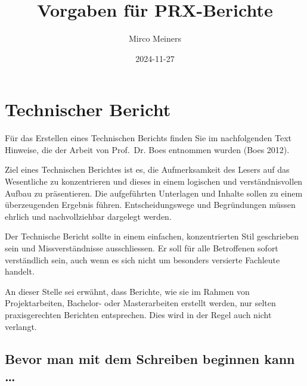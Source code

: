 \documentclass[
  letterpaper,
  DIV=11]{scrartcl}
\title{Vorgaben für PRX-Berichte}
\author{Mirco Meiners}
\date{2024-11-27}
\begin{document}
\maketitle


\section{Technischer Bericht}\label{technischer-bericht}

Für das Erstellen eines Technischen Berichts finden Sie im nachfolgenden
Text Hinweise, die der Arbeit von Prof.~Dr. Boes entnommen wurden (Boes
2012).

Ziel eines Technischen Berichtes ist es, die Aufmerksamkeit des Lesers
auf das Wesentliche zu konzentrieren und dieses in einem logischen und
verständnisvollen Aufbau zu präsentieren. Die aufgeführten Unterlagen
und Inhalte sollen zu einem überzeugenden Ergebnis führen.
Entscheidungswege und Begründungen müssen ehrlich und nachvollziehbar
dargelegt werden.

Der Technische Bericht sollte in einem einfachen, konzentrierten Stil
geschrieben sein und Missverständnisse ausschliessen. Er soll für alle
Betroffenen sofort verständlich sein, auch wenn es sich nicht um
besonders versierte Fachleute handelt.

An dieser Stelle sei erwähnt, dass Berichte, wie sie im Rahmen von
Projektarbeiten, Bachelor- oder Masterarbeiten erstellt werden, nur
selten praxisgerechten Berichten entsprechen. Dies wird in der Regel
auch nicht verlangt.

\subsection{Bevor man mit dem Schreiben beginnen kann
\ldots{}}\label{bevor-man-mit-dem-schreiben-beginnen-kann}
\end{document}
